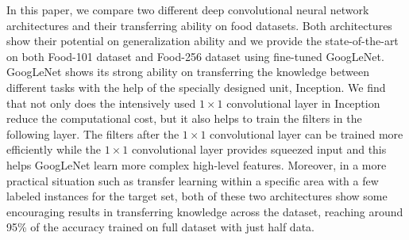 In this paper, we compare two different deep convolutional neural network architectures and their transferring ability on food datasets. Both architectures show their potential on generalization ability and we provide the state-of-the-art on both Food-101 dataset and Food-256 dataset using fine-tuned GoogLeNet. GoogLeNet shows its strong ability on transferring the knowledge between different tasks with the help of the specially designed unit, Inception.
We find that not only does the intensively used $1\times 1$ convolutional layer in Inception reduce the computational cost, but it also helps to train the filters in the following layer. The filters after the $1\times 1$ convolutional layer can be trained more efficiently while the $1\times 1$ convolutional layer provides squeezed input and this helps GoogLeNet learn more complex high-level features.
Moreover, in a more practical situation such as transfer learning within a specific area with a few labeled instances for the target set, both of these two architectures show some encouraging results in transferring knowledge across the dataset, reaching around 95\% of the accuracy trained on full dataset with just half data.

